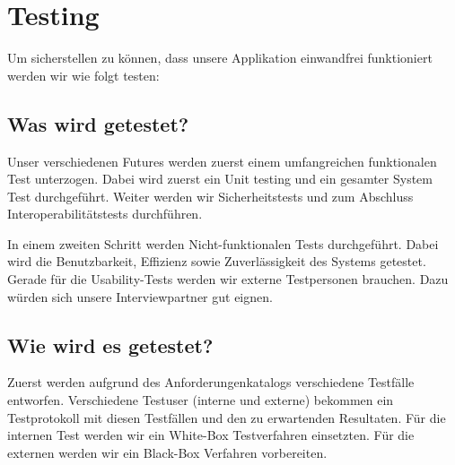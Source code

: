 \chapter{Testing}

Um sicherstellen zu können, dass unsere Applikation einwandfrei funktioniert werden wir wie folgt testen:

\section{Was wird getestet?}

Unser verschiedenen Futures werden zuerst einem umfangreichen funktionalen Test unterzogen. Dabei wird zuerst ein Unit testing und ein gesamter System Test durchgeführt. Weiter werden wir Sicherheitstests und zum Abschluss Interoperabilitätstests durchführen.

In einem zweiten Schritt werden Nicht-funktionalen Tests durchgeführt. Dabei wird die Benutzbarkeit, Effizienz sowie Zuverlässigkeit des Systems getestet. Gerade für die Usability-Tests werden wir externe Testpersonen brauchen. Dazu würden sich unsere Interviewpartner gut eignen.

\section{Wie wird es getestet?}

Zuerst werden aufgrund des Anforderungenkatalogs verschiedene Testfälle entworfen. 
Verschiedene Testuser (interne und externe) bekommen ein Testprotokoll mit diesen Testfällen und den zu erwartenden Resultaten. 
Für die internen Test werden wir ein White-Box Testverfahren einsetzten. Für die externen werden wir ein Black-Box Verfahren vorbereiten.
